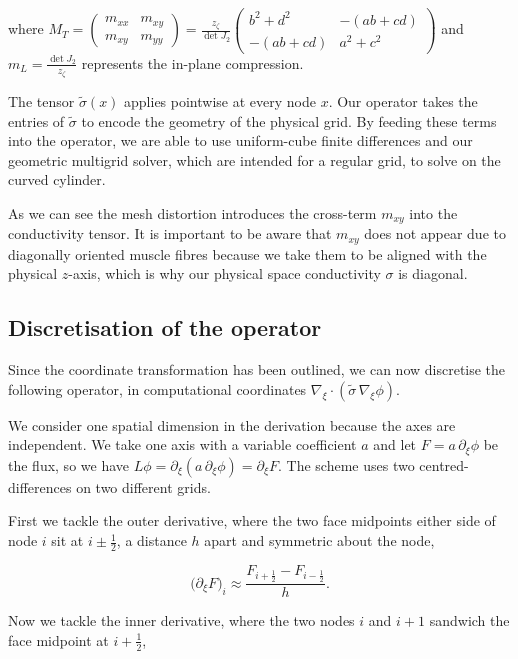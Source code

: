 \documentclass[final-report]{report-template}
\begin{document}
where $M_T = \begin{pmatrix} m_{xx} & m_{xy}\\ m_{xy} & m_{yy} \end{pmatrix} = \frac{z_\zeta}{\det J_2} \begin{pmatrix} b^2+d^2 & -(ab+cd)\\ -(ab+cd) & a^2+c^2 \end{pmatrix}$ and $m_L=\frac{\det J_2}{z_\zeta}$ represents the in-plane compression.

The tensor $\tilde\sigma (x)$ applies pointwise at every node $x$. Our operator takes the entries of $\tilde\sigma$ to encode the geometry of the physical grid. By feeding these terms into the operator, we are able to use uniform-cube finite differences and our geometric multigrid solver, which are intended for a regular grid, to solve on the curved cylinder.

As we can see the mesh distortion introduces the cross-term $m_{xy}$ into the conductivity tensor. It is important to be aware that $m_{xy}$ does not appear due to diagonally oriented muscle fibres because we take them to be aligned with the physical  $z$-axis, which is why our physical space conductivity $\sigma$ is diagonal.

\subsection{Discretisation of the operator}
\label{sec:operator-discretisation}

Since the coordinate transformation has been outlined, we can now discretise the following operator, in computational coordinates $\nabla_\xi\!\cdot(\tilde\sigma\,\nabla_\xi\phi)$.

We consider one spatial dimension in the derivation because the axes are independent. We take one axis with a variable coefficient $a$ and let $F=a\,\partial_\xi\phi$ be the flux, so we have $L\phi=\partial_\xi\!\left(a\,\partial_\xi\phi\right)=\partial_\xi F$. The scheme uses two centred-differences on two different grids.

First we tackle the outer derivative, where the two face midpoints either side of node $i$ sit at $i\pm\tfrac12$, a distance $h$ apart and symmetric about the node,

$$
\big(\partial_\xi F\big)_i \approx \frac{F_{i+\frac12}-F_{i-\frac12}}{h}.
$$

Now we tackle the inner derivative, where the two nodes $i$ and $i+1$ sandwich the face midpoint at $i+\tfrac12$,
\end{document}
